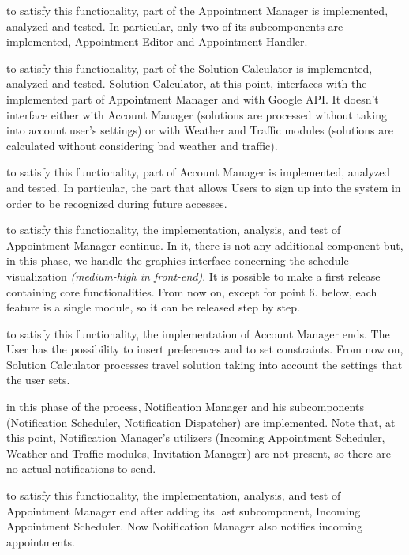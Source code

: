 \begin{description}[before={\renewcommand{\makelabel}[1]{ \textbf{\textit{##1}}:}}]
		
	\item[1. Appointment creation and management] to satisfy this functionality, part of the Appointment Manager is implemented, analyzed and tested. In particular, only two of its subcomponents are implemented, Appointment Editor and Appointment Handler.
	\item[2. Solution calculation] to satisfy this functionality, part of the Solution Calculator is implemented, analyzed and tested. Solution Calculator, at this point, interfaces with the implemented part of Appointment Manager and with Google API. It doesn't interface either with Account Manager (solutions are processed without taking into account user's settings) or with Weather and Traffic modules (solutions are calculated without considering bad weather and traffic).
	\item[3. Sign up] to satisfy this functionality, part of Account Manager is implemented, analyzed and tested. In particular, the part that allows Users to sign up into the system in order to be recognized during future accesses.
	\item[4. Schedule visualization] to satisfy this functionality, the implementation, analysis, and test of Appointment Manager continue. In it, there is not any additional component but, in this phase, we handle the graphics interface concerning the schedule visualization \textit{(medium-high in front-end)}.\newline
	It is possible to make a first release containing core functionalities. From now on, except for point 6. below, each feature is a single module, so it can be released step by step.
	\item[5. Settings] to satisfy this functionality, the implementation of Account Manager ends. The User has the possibility to insert preferences and to set constraints. From now on, Solution Calculator processes travel solution taking into account the settings that the user sets.
	\item[6. Notification system] in this phase of the process, Notification Manager and his subcomponents (Notification Scheduler, Notification Dispatcher) are implemented. Note that, at this point, Notification Manager's utilizers (Incoming Appointment Scheduler, Weather and Traffic modules, Invitation Manager) are not present, so there are no actual notifications to send.
	\item[7. Incoming Appointments] to satisfy this functionality, the implementation, analysis, and test of Appointment Manager end after adding its last subcomponent, Incoming Appointment Scheduler. Now Notification Manager also notifies incoming appointments.

\end{description}
